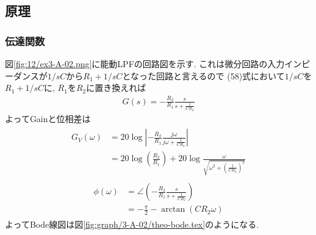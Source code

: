 \subsection{原理}
\subsubsection{伝達関数}
図\ref{fig:12/ex3-A-02.png}に能動LPFの回路図を示す.
これは微分回路の入力インピーダンスが$1/sC$から$R_1+1/sC$となった回路と言えるので
(58)式において$1/sC$を$R_1+1/sC$に, $R_1$を$R_2$に置き換えれば
\begin{align}
  G(s)=-\frac{R_2}{R_1}\frac{s}{s+\frac{1}{CR_2}}
\end{align}
よってGainと位相差は
\begin{align}
  \begin{split}
    G_V(\omega)&=20\log\left|-\frac{R_2}{R_1}\frac{j\omega}{j\omega+\frac{1}{CR_2}}\right|\\
    &=20\log\left(\frac{R_2}{R_1}\right)+20\log\frac{\omega}{\sqrt{\omega^2+\left(\frac{1}{CR_2}\right)^2}}
  \end{split}
\end{align}
\begin{align}
  \begin{split}
    \phi(\omega)&=\angle\left(-\frac{R_2}{R_1}\frac{s}{s+\frac{1}{CR_2}}\right)\\
    &=-\frac{\pi}{2}-\arctan(CR_2\omega)
  \end{split}
\end{align}
よってBode線図は図\ref{fig:graph/3-A-02/theo-bode.tex}のようになる.
